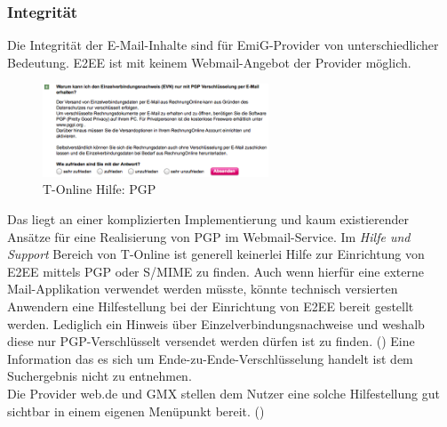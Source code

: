 \documentclass  [paper=a4,
				fontsize=12pt,
				listof=totoc,
				bibliography=totoc
				]{scrreprt}
\begin{document}
		\subsubsection{Integrität}	
			Die Integrität der E-Mail-Inhalte sind für EmiG-Provider von unterschiedlicher Bedeutung.
			\acf{E2EE} ist mit keinem Webmail-Angebot der Provider möglich.

			\begin{figure} %
				\vspace{-12pt}
				\centering
				\includegraphics[width=0.6\textwidth]{images/T-Online_Hilfe_PGP}
				\caption[T-Online PGP]{T-Online Hilfe: PGP} 
				\label{fig:T-Online_Hilfe_PGP} %
				\vspace{-12pt}
			\end{figure}
			Das liegt an einer komplizierten Implementierung und kaum existierender Ansätze für eine Realisierung von PGP im Webmail-Service.
			Im \textit{Hilfe und Support} Bereich von T-Online ist generell keinerlei Hilfe zur Einrichtung von E2EE mittels PGP oder S/MIME zu finden.
			Auch wenn hierfür eine externe Mail-Applikation verwendet werden müsste, könnte technisch versierten Anwendern eine Hilfestellung bei der Einrichtung von E2EE bereit gestellt werden.
			Lediglich ein Hinweis über Einzelverbindungsnachweise und weshalb diese nur PGP-Verschlüsselt versendet werden dürfen ist zu finden. ()
			Eine Information das es sich um Ende-zu-Ende-Verschlüsselung handelt ist dem Suchergebnis nicht zu entnehmen.\\
			Die Provider web.de und GMX stellen dem Nutzer eine solche Hilfestellung gut sichtbar in einem eigenen Menüpunkt bereit. ()
			
\end{document}
